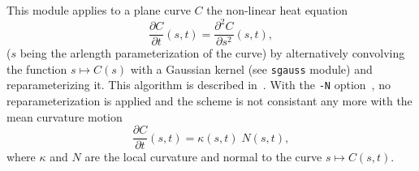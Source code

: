 This module applies to a plane curve $C$ the non-linear heat 
equation~\cite{gage.hamilton:heat}~\cite{grayson:heat}
$$\frac{\partial C}{\partial t}(s,t) 
= \frac{\partial^2 C}{\partial s^2}(s,t),$$
($s$ being the arlength parameterization of the curve)
by alternatively convolving the function $s\mapsto C(s)$ with a
Gaussian kernel (see \verb+sgauss+ module) and reparameterizing it.
This algorithm is described in~\cite{mackworth.mokhtarian:theory}. 
With the \verb+-N+ option~\cite{mackworth.mokhtarian:scale-based}, 
no reparameterization is applied and the scheme
is not consistant any more with the mean curvature motion
$$\frac{\partial C}{\partial t}(s,t) = \kappa(s,t) \; N(s,t),$$
where $\kappa$ and $N$ are the local curvature and normal to the curve
$s\mapsto C(s,t)$.
